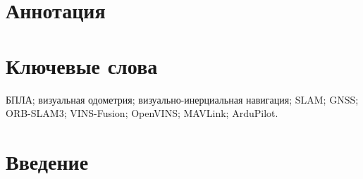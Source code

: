 \documentclass[a4paper,12pt]{extarticle}
\begin{document}
    

    \newpage
    \setcounter{page}{2}

    {
        \hypersetup{linkcolor=black}
        \tableofcontents
    }

    \newpage

    \section*{Аннотация}


    \section*{Ключевые слова}
    БПЛА; визуальная одометрия; визуально-инерциальная навигация; SLAM; GNSS; ORB-SLAM3; VINS-Fusion; OpenVINS; MAVLink; ArduPilot.
    \pagebreak

    \section{Введение}\label{sec:introduce}


    \pagebreak

    

    

    

    

    \printbibliography[heading=bibintoc]
\end{document}
